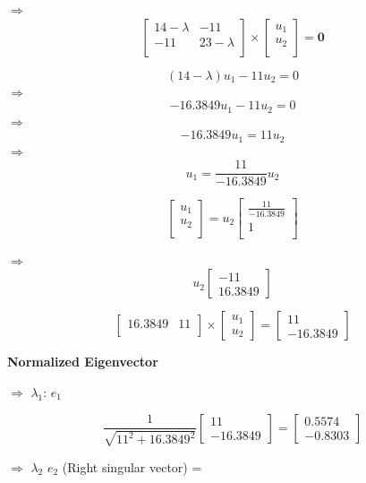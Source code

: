 \documentclass[
  letterpaper,
  DIV=11,
  numbers=noendperiod]{scrreprt}
\begin{document}
\(\Rightarrow\) \[\begin{bmatrix}
 14-\lambda & -11 \\
 -11& 23-\lambda  \\
\end{bmatrix}\times\begin{bmatrix}
u_1 \\
u_2 \\
\end{bmatrix}=\mathbf{0}
\]

\[(14- \lambda)u_1 - 11u_2 = 0 \] \(\Rightarrow\)
\[-16.3849u_1 -11u_2 = 0\] \(\Rightarrow\) \[-16.3849u_1= 11u_2 \]
\(\Rightarrow\) \[u_1 = \frac{11}{-16.3849}u_2\]

\[
\begin{bmatrix}
u_1 \\
u_2 \\
\end{bmatrix}= u_2\begin{bmatrix}
\frac{11}{-16.3849}\\
1 \\
\end{bmatrix}
\]

\(\Rightarrow\) \[u_2\begin{bmatrix}
-11\\ 16.3849
\end{bmatrix}\]

\[
\begin{bmatrix}
16.3849 & 11 \\
\end{bmatrix} \times \begin{bmatrix}
u_1 \\ u_2
\end{bmatrix} = \begin{bmatrix}
11 \\ -16.3849
\end{bmatrix}
\]

\textbf{Normalized Eigenvector}

\(\Rightarrow\) \(\lambda_1\): \(e_1\)

\[
\frac{1}{\sqrt{{11^2 +16.3849^2}}}\begin{bmatrix}
11 \\ -16.3849
\end{bmatrix}= \begin{bmatrix}
0.5574 \\ -0.8303
\end{bmatrix} 
\]

\(\Rightarrow\) \(\lambda_2\) \(e_2\) (Right singular vector) =
\end{document}
